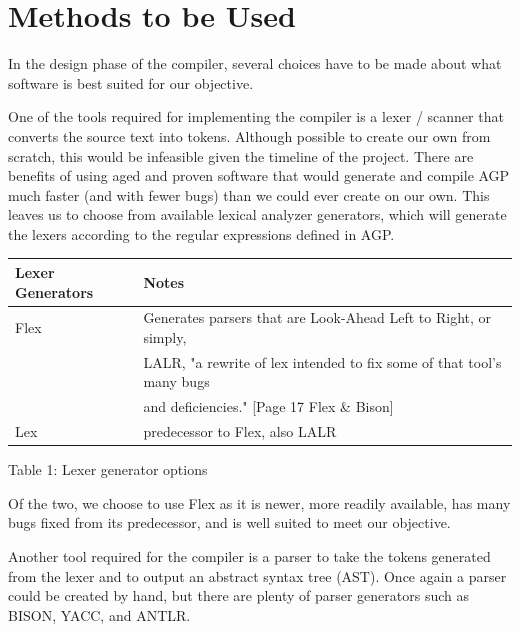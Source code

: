 \documentclass[11pt]{article}
\begin{document}
\section{Methods to be Used}

In the design phase of the compiler, several choices have to be made about what software is best suited for our objective. 

One of the tools required for implementing the compiler is a lexer / scanner that converts the source text into tokens. Although possible to create our own from scratch, this would be infeasible given the timeline of the project. There are benefits of using aged and proven software that would generate and compile AGP much faster (and with fewer bugs) than we could ever create on our own. This leaves us to choose from available lexical analyzer generators, which will generate the lexers according to the regular expressions defined in AGP.

\begin{center}
\begin{tabular}{ |l | l|  }
 \hline
 Lexer Generators & Notes \\
 \hline 
 Flex & Generates parsers that are Look-Ahead Left to Right, or simply,\\ 
 	  &
 LALR, "a rewrite of lex intended to fix some of that tool's many bugs \\
 	  &
 and deficiencies." [Page 17 Flex \& Bison] \\ 
 \hline 
 Lex & predecessor to Flex, also LALR \\
 \hline
\end{tabular}
\end{center}

\begin{center}
Table 1: Lexer generator options
\end{center}

Of the two, we choose to use Flex as it is newer, more readily available, has many bugs fixed from its predecessor, and is well suited to meet our objective. 

Another tool required for the compiler is a parser to take the tokens generated from the lexer and to output an abstract syntax tree (AST). Once again a parser could be created by hand, but there are plenty of parser generators such as BISON, YACC, and ANTLR.
\end{document}
